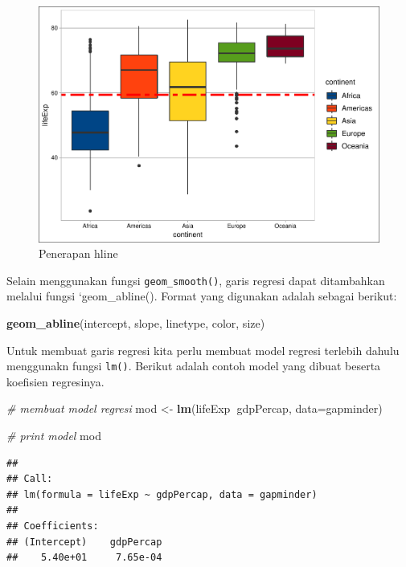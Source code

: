 \documentclass[]{book}
\newenvironment{Shaded}{\begin{snugshade}}{\end{snugshade}}
\newcommand{\KeywordTok}[1]{\textcolor[rgb]{0.13,0.29,0.53}{\textbf{#1}}}
\newcommand{\DataTypeTok}[1]{\textcolor[rgb]{0.13,0.29,0.53}{#1}}
\newcommand{\StringTok}[1]{\textcolor[rgb]{0.31,0.60,0.02}{#1}}
\newcommand{\CommentTok}[1]{\textcolor[rgb]{0.56,0.35,0.01}{\textit{#1}}}
\newcommand{\OperatorTok}[1]{\textcolor[rgb]{0.81,0.36,0.00}{\textbf{#1}}}
\newcommand{\NormalTok}[1]{#1}
\begin{document}
\begin{figure}

{\centering \includegraphics[width=0.7\linewidth]{EnvStat_files/figure-latex/gghline-1} 

}

\caption{Penerapan hline}\label{fig:gghline}
\end{figure}

Selain menggunakan fungsi \texttt{geom\_smooth()}, garis regresi dapat
ditambahkan melalui fungsi `geom\_abline(). Format yang digunakan adalah
sebagai berikut:

\begin{Shaded}
\begin{Highlighting}[]
\KeywordTok{geom_abline}\NormalTok{(intercept, slope, linetype, color, size)}
\end{Highlighting}
\end{Shaded}

Untuk membuat garis regresi kita perlu membuat model regresi terlebih
dahulu menggunakn fungsi \texttt{lm()}. Berikut adalah contoh model yang
dibuat beserta koefisien regresinya.

\begin{Shaded}
\begin{Highlighting}[]
\CommentTok{# membuat model regresi}
\NormalTok{mod <-}\StringTok{ }\KeywordTok{lm}\NormalTok{(lifeExp}\OperatorTok{~}\NormalTok{gdpPercap, }\DataTypeTok{data=}\NormalTok{gapminder)}

\CommentTok{# print model}
\NormalTok{mod}
\end{Highlighting}
\end{Shaded}

\begin{verbatim}
## 
## Call:
## lm(formula = lifeExp ~ gdpPercap, data = gapminder)
## 
## Coefficients:
## (Intercept)    gdpPercap  
##    5.40e+01     7.65e-04
\end{verbatim}
\end{document}
